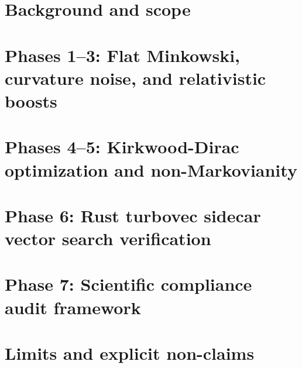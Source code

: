 \documentclass[11pt,a4paper]{article}
\theoremstyle{reproduction}
\begin{document}
\clearpage
\tableofcontents
\clearpage

\section{Background and scope}
\label{sec:background}




\section{Phases 1--3: Flat Minkowski, curvature noise, and relativistic boosts}
\label{sec:phases_1_3}



\section{Phases 4--5: Kirkwood-Dirac optimization and non-Markovianity}
\label{sec:phases_4_5}



\section{Phase 6: Rust turbovec sidecar vector search verification}
\label{sec:phase_6}



\section{Phase 7: Scientific compliance audit framework}
\label{sec:scientific_audit}



\section{Limits and explicit non-claims}
\label{sec:limits}
\end{document}
